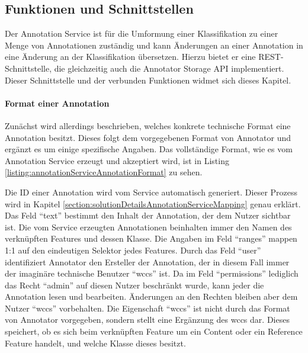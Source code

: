 \subsection{Funktionen und Schnittstellen}
    Der Annotation Service ist für die Umformung einer Klassifikation zu
    einer Menge von Annotationen zuständig und kann Änderungen an einer
    Annotation in eine Änderung an der Klassifikation übersetzen.
    Hierzu bietet er eine REST-Schnittstelle, die gleichzeitig auch die Annotator Storage API implementiert.
    Dieser Schnittstelle und der verbunden Funktionen widmet sich dieses Kapitel.

    \paragraph{Format einer Annotation}
    Zunächst wird allerdings beschrieben, welches konkrete technische Format eine Annotation besitzt.
    Dieses folgt dem vorgegebenen Format von Annotator und ergänzt es um einige spezifische Angaben.
    Das vollständige Format, wie es vom Annotation Service erzeugt und akzeptiert wird,
    ist in Listing \ref{listing:annotationServiceAnnotationFormat} zu sehen.

    

    Die ID einer Annotation wird vom Service automatisch generiert.
    Dieser Prozess wird in Kapitel \ref{section:solutionDetailsAnnotationServiceMapping}
    genau erklärt.
    Das Feld "`text"' bestimmt den Inhalt der Annotation, der dem Nutzer sichtbar ist.
    Die vom Service erzeugten Annotationen beinhalten immer den Namen des verknüpften Features und dessen Klasse.
    Die Angaben im Feld "`ranges"' mappen 1:1 auf den eindeutigen Selektor jedes Features.
    Durch das Feld "`user"' identifiziert Annotator den Ersteller der Annotation,
    der in diesem Fall immer der imaginäre technische Benutzer "`wccs"' ist.
    Da im Feld "`permissions"' lediglich das Recht "`admin"' auf diesen Nutzer beschränkt wurde,
    kann jeder die Annotation lesen und bearbeiten.
    Änderungen an den Rechten bleiben aber dem Nutzer "`wccs"' vorbehalten.
    Die Eigenschaft "`wccs"' ist nicht durch das Format von Annotator vorgegeben,
    sondern stellt eine Ergänzung des \gls{wccs} dar.
    Dieses speichert, ob es sich beim verknüpften Feature um ein Content oder ein Reference Feature handelt,
    und welche Klasse dieses besitzt.

